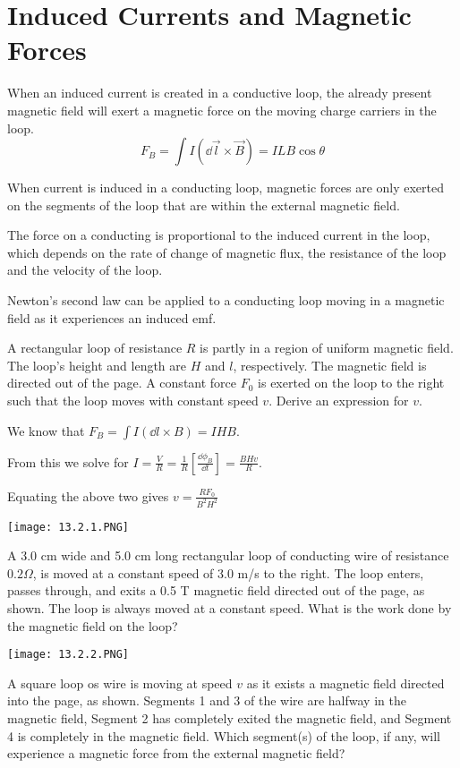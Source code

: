 \documentclass[../em.tex]{subfiles}
\begin{document}
\section{Induced Currents and Magnetic Forces}
When an induced current is created in a conductive loop, the already present magnetic field will exert a magnetic force on the moving charge carriers in the loop.
\[ F_B = \int I(\dd \vec{l}\times \vec{B}) = ILB\cos\theta \]

When current is induced in a conducting loop, magnetic forces are only exerted on the segments of the loop that are within the external magnetic field.

The force on a conducting is proportional to the induced current in the loop, which depends on the rate of change of magnetic flux, the resistance 
of the loop and the velocity of the loop.

Newton's second law can be applied to a conducting loop moving in a magnetic field as it experiences an induced emf.

\begin{example}
    A rectangular loop of resistance $R$ is partly in a region of uniform magnetic field. The loop's height and length are $H$ and $l$, respectively. The magnetic field is directed out of the page.
    A constant force $F_0$ is exerted on the loop to the right such that the loop moves with constant speed $v$. Derive an expression for $v$.

    We know that $F_B=\int I(\dd l\times B)=IHB$.

    From this we solve for $I=\frac{V}{R}=\frac{1}{R}\left[\frac{\dd \phi_B}{\dd t}\right]=\frac{BHv}{R}$.

    Equating the above two gives $v=\frac{RF_0}{B^2H^2}$
\end{example}

\ex \begin{center}
    \texttt{[image: 13.2.1.PNG]}
\end{center}
A 3.0 cm wide and 5.0 cm long rectangular loop of conducting wire of resistance $0.2\Omega$, is moved at a constant speed of 3.0 m/s to the right. The loop enters, passes through, and exits a 0.5 T 
magnetic field directed out of the page, as shown. The loop is always moved at a constant speed. What is the work done by the magnetic field on the loop?

\ex \begin{center}
    \texttt{[image: 13.2.2.PNG]}
\end{center}
A square loop os wire is moving at speed $v$ as it exists a magnetic field directed into the page, as shown. Segments 1 and 3 of the wire are halfway in the magnetic field, Segment 2 
has completely exited the magnetic field, and Segment 4 is completely in the magnetic field. Which segment(s) of the loop, if any, will experience a magnetic force from the external magnetic field?
\end{document}
